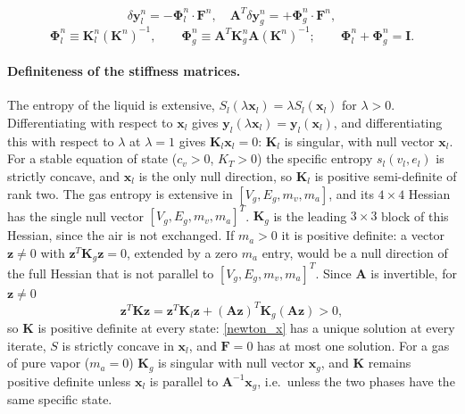 \begin{equation}
\delta{\boldsymbol{y}}_l^{n} = - \boldsymbol{\Phi}_l^n \cdot \boldsymbol{F}^n, \quad \boldsymbol{A}^T\delta{\boldsymbol{y}}_g^{n} = + \boldsymbol{\Phi}_g^n \cdot \boldsymbol{F}^n,
\end{equation}
\begin{equation}
\boldsymbol{\Phi}^n_l\equiv \boldsymbol{K}^n_l(\boldsymbol{K}^n)^{-1},\qquad \boldsymbol{\Phi}^n_g\equiv \boldsymbol{A}^T\boldsymbol{K}^n_g\boldsymbol{A}(\boldsymbol{K}^n)^{-1};\qquad \boldsymbol{\Phi}^n_l+\boldsymbol{\Phi}^n_g=\boldsymbol{I}.
\end{equation}
\paragraph{Definiteness of the stiffness matrices.}
The entropy of the liquid is extensive, $S_l(\lambda\boldsymbol{x}_l)=\lambda S_l(\boldsymbol{x}_l)$ for $\lambda>0$. Differentiating with respect to $\boldsymbol{x}_l$ gives $\boldsymbol{y}_l(\lambda\boldsymbol{x}_l)=\boldsymbol{y}_l(\boldsymbol{x}_l)$, and differentiating this with respect to $\lambda$ at $\lambda=1$ gives $\boldsymbol{K}_l\boldsymbol{x}_l=0$: $\boldsymbol{K}_l$ is singular, with null vector $\boldsymbol{x}_l$. For a stable equation of state ($c_v>0$, $K_T>0$) the specific entropy $s_l(v_l,e_l)$ is strictly concave, and $\boldsymbol{x}_l$ is the only null direction, so $\boldsymbol{K}_l$ is positive semi-definite of rank two. The gas entropy is extensive in $[V_g,E_g,m_v,m_a]$, and its $4\times4$ Hessian has the single null vector $[V_g,E_g,m_v,m_a]^T$. $\boldsymbol{K}_g$ is the leading $3\times3$ block of this Hessian, since the air is not exchanged. If $m_a>0$ it is positive definite: a vector $\boldsymbol{z}\neq0$ with $\boldsymbol{z}^T\boldsymbol{K}_g\boldsymbol{z}=0$, extended by a zero $m_a$ entry, would be a null direction of the full Hessian that is not parallel to $[V_g,E_g,m_v,m_a]^T$. Since $\boldsymbol{A}$ is invertible, for $\boldsymbol{z}\neq0$
\begin{equation}
\boldsymbol{z}^T\boldsymbol{K}\boldsymbol{z}=\boldsymbol{z}^T\boldsymbol{K}_l\boldsymbol{z}+(\boldsymbol{A}\boldsymbol{z})^T\boldsymbol{K}_g(\boldsymbol{A}\boldsymbol{z})>0 ,
\end{equation}
so $\boldsymbol{K}$ is positive definite at every state: \eqref{newton_x} has a unique solution at every iterate, $S$ is strictly concave in $\boldsymbol{x}_l$, and $\boldsymbol{F}=0$ has at most one solution. For a gas of pure vapor ($m_a=0$) $\boldsymbol{K}_g$ is singular with null vector $\boldsymbol{x}_g$, and $\boldsymbol{K}$ remains positive definite unless $\boldsymbol{x}_l$ is parallel to $\boldsymbol{A}^{-1}\boldsymbol{x}_g$, i.e.\ unless the two phases have the same specific state.

